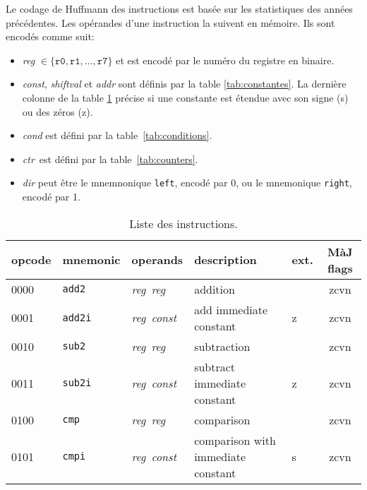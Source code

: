 \documentclass[architecture]{compas2018}
\newcommand{\reg}{\textit{reg}}
\newcommand{\const}{\textit{const}}
\newcommand{\ctr}{\textit{ctr}}
\begin{document}
\begin{table}[!h]
  \caption{Liste des instructions.}
  \label{tab:opcodes}
  Le codage de Huffmann des instructions est basée sur les statistiques des années précédentes.
  Les opérandes d'une instruction la suivent en mémoire. Ils sont encodés comme suit:
  \begin{itemize}
\item \textit{reg} $\in \{\mathtt{r0}, \mathtt{r1}, ..., \mathtt{r7}\}$ et est encodé par le numéro du registre en binaire.
\item \textit{const}, \textit{shiftval} et \textit{addr} sont définis par la table \ref{tab:constantes}. La dernière colonne de la table  \ref{tab:opcodes} précise si une constante est étendue avec son signe (s) ou des zéros (z).   
\item  \textit{cond} est défini par la table~\ref{tab:conditions}.
\item \ctr\ est défini par la table~\ref{tab:counters}.
\item \textit{dir} peut être le mnemnonique \texttt{left}, encodé par 0, ou le mnemonique \texttt{right}, encodé par 1.
\end{itemize}
\begin{center}
  \begin{tabular}{|l|l|l|l|l|c|}
    \hline  
    opcode  & mnemonic        & operands                      & description                                          & ext. & {MàJ flags} \\
    \hline  
    \hline  
    0000    & \texttt{add2}   & \reg\ \reg\                   & addition                                             &      & zcvn        \\
    \hline
    0001    & \texttt{add2i}  & \reg\ \const\                 & add immediate constant                               & z    & zcvn        \\
    \hline
    0010    & \texttt{sub2}   & \reg\ \reg\                   & subtraction                                          &      & zcvn        \\
    \hline
    0011    & \texttt{sub2i}  & \reg\ \const\                 & subtract immediate constant                          & z    & zcvn        \\
    \hline
    0100    & \texttt{cmp}    & \reg\ \reg\                   & comparison                                           &      & zcvn        \\
    \hline
    0101    & \texttt{cmpi}   & \reg\ \const\                 & comparison with immediate constant                   & s    & zcvn        \\

\end{tabular}
\end{center}
\end{table}
\end{document}
